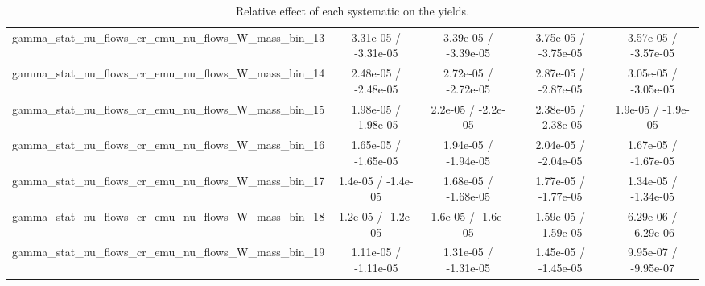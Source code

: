\documentclass[10pt]{article}
\begin{document}
\begin{table}[htbp]
\begin{center}
\begin{tabular}{|c|c|c|c|c|}
  gamma_stat_nu_flows_cr_emu_nu_flows_W_mass_bin_13 & 3.31e-05 / -3.31e-05 & 3.39e-05 / -3.39e-05 & 3.75e-05 / -3.75e-05 & 3.57e-05 / -3.57e-05 \\ 
  gamma_stat_nu_flows_cr_emu_nu_flows_W_mass_bin_14 & 2.48e-05 / -2.48e-05 & 2.72e-05 / -2.72e-05 & 2.87e-05 / -2.87e-05 & 3.05e-05 / -3.05e-05 \\ 
  gamma_stat_nu_flows_cr_emu_nu_flows_W_mass_bin_15 & 1.98e-05 / -1.98e-05 & 2.2e-05 / -2.2e-05 & 2.38e-05 / -2.38e-05 & 1.9e-05 / -1.9e-05 \\ 
  gamma_stat_nu_flows_cr_emu_nu_flows_W_mass_bin_16 & 1.65e-05 / -1.65e-05 & 1.94e-05 / -1.94e-05 & 2.04e-05 / -2.04e-05 & 1.67e-05 / -1.67e-05 \\ 
  gamma_stat_nu_flows_cr_emu_nu_flows_W_mass_bin_17 & 1.4e-05 / -1.4e-05 & 1.68e-05 / -1.68e-05 & 1.77e-05 / -1.77e-05 & 1.34e-05 / -1.34e-05 \\ 
  gamma_stat_nu_flows_cr_emu_nu_flows_W_mass_bin_18 & 1.2e-05 / -1.2e-05 & 1.6e-05 / -1.6e-05 & 1.59e-05 / -1.59e-05 & 6.29e-06 / -6.29e-06 \\ 
  gamma_stat_nu_flows_cr_emu_nu_flows_W_mass_bin_19 & 1.11e-05 / -1.11e-05 & 1.31e-05 / -1.31e-05 & 1.45e-05 / -1.45e-05 & 9.95e-07 / -9.95e-07 \\ 
\hline 
\end{tabular} 
\caption{Relative effect of each systematic on the yields.} 
\end{center} 
\end{table} 
\end{document}
